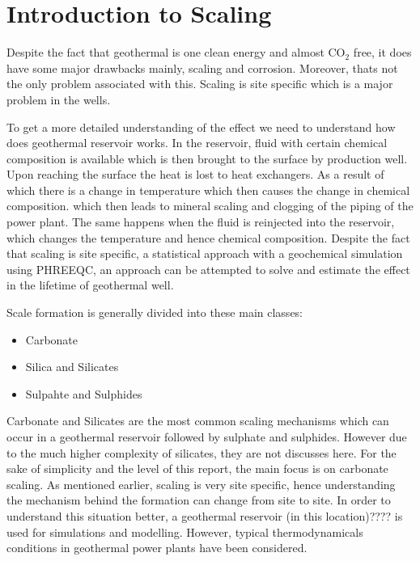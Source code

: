 \section{Introduction to Scaling}
\newline \newline

Despite the fact that geothermal is one clean energy and almost CO$_2$ free, it does have some major drawbacks mainly, scaling and corrosion. Moreover, thats not the only problem associated with this. Scaling is site specific which is a major problem in the wells. 
\newline\newline

To get a more detailed understanding of the effect we need to understand how does geothermal reservoir works. In the reservoir, fluid with certain chemical composition is available which is then brought to the surface by production well. Upon reaching the surface the heat is lost to heat exchangers. As a result of which there is a change in temperature which then causes the change in chemical composition. which then leads to mineral scaling and clogging of the piping of the power plant. 
The same happens when the fluid is reinjected into the reservoir, which changes the temperature and hence chemical composition. 
Despite the fact that scaling is site specific, a statistical approach with a geochemical simulation using PHREEQC, an approach can be attempted to solve and estimate the effect in the lifetime of geothermal well. 

Scale formation is generally divided into these main classes: 
\begin{itemize}
    \item Carbonate
    \item Silica and Silicates 
    \item Sulpahte and Sulphides 
\end{itemize}
\newline\newline

Carbonate and Silicates are the most common scaling mechanisms which can occur in a geothermal reservoir followed by sulphate and sulphides. However due to the much higher complexity of silicates, they are not discusses here. For the sake of simplicity and the level of this report, the main focus is on carbonate scaling. 
\newline
As mentioned earlier, scaling is very site specific, hence understanding the mechanism behind the formation can change from site to site. In order to understand this situation better, a geothermal reservoir (in this location)???? is used for simulations and modelling. However, typical thermodynamicals conditions in geothermal power plants have been considered.
